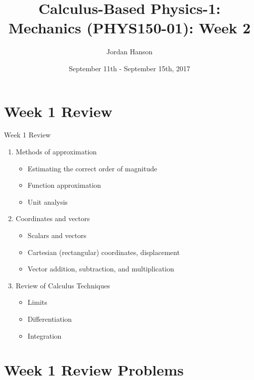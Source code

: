 \documentclass{beamer}
\title{Calculus-Based Physics-1: Mechanics (PHYS150-01): Week 2}
\date{September 11th - September 15th, 2017}
\author{Jordan Hanson}
\institute{Whittier College Department of Physics and Astronomy}
\begin{document}
\maketitle

\section{Week 1 Review}

\begin{frame}{Week 1 Review}
\begin{enumerate}
\item Methods of approximation
\begin{itemize}
\item \alert{Estimating} the correct order of magnitude
\item \alert{Function} approximation
\item \alert{Unit analysis}
\end{itemize}
\item Coordinates and vectors
\begin{itemize}
\item \alert{Scalars} and \alert{vectors}
\item \alert{Cartesian} (rectangular) coordinates, displacement
\item \alert{Vector} addition, subtraction, and multiplication
\end{itemize}
\item Review of Calculus Techniques
\begin{itemize}
\item Limits
\item Differentiation
\item Integration
\end{itemize}
\end{enumerate}
\end{frame}

\section{Week 1 Review Problems}
\end{document}
